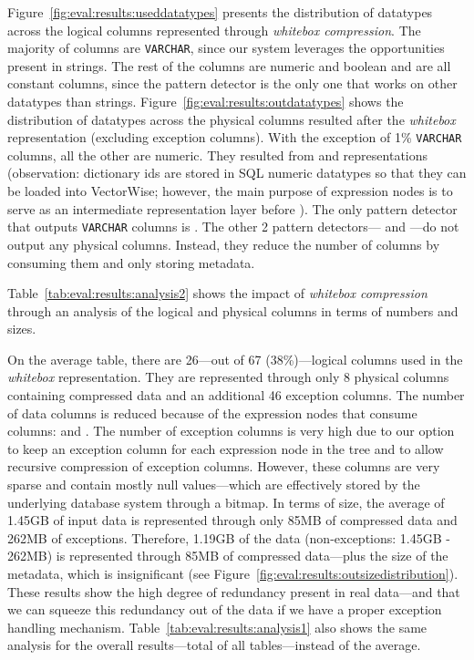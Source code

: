 Figure~\ref{fig:eval:results:useddatatypes} presents the distribution of datatypes across the logical columns represented through \textit{whitebox compression}. The majority of columns are \verb|VARCHAR|, since our system leverages the opportunities present in strings. The rest of the columns are numeric and boolean and are all constant columns, since the  pattern detector is the only one that works on other datatypes than strings. Figure~\ref{fig:eval:results:outdatatypes} shows the distribution of datatypes across the physical columns resulted after the \textit{whitebox} representation (excluding exception columns). With the exception of 1\% \verb|VARCHAR| columns, all the other are numeric. They resulted from  and  representations (observation: dictionary ids are stored in SQL numeric datatypes so that they can be loaded into VectorWise; however, the main purpose of  expression nodes is to serve as an intermediate representation layer before ). The only pattern detector that outputs \verb|VARCHAR| columns is . The other 2 pattern detectors--- and ---do not output any physical columns. Instead, they reduce the number of columns by consuming them and only storing metadata.

Table~\ref{tab:eval:results:analysis2} shows the impact of \textit{whitebox compression} through an analysis of the logical and physical columns in terms of numbers and sizes. 



On the average table, there are 26---out of 67 (38\%)---logical columns used in the \textit{whitebox} representation. They are represented through only 8 physical columns containing compressed data and an additional 46 exception columns. The number of data columns is reduced because of the expression nodes that consume columns:  and . The number of exception columns is very high due to our option to keep an exception column for each expression node in the tree and to allow recursive compression of exception columns. However, these columns are very sparse and contain mostly null values---which are effectively stored by the underlying database system through a bitmap. In terms of size, the average of 1.45GB of input data is represented through only 85MB of compressed data and 262MB of exceptions. Therefore, 1.19GB of the data (non-exceptions: 1.45GB - 262MB) is represented through 85MB of compressed data---plus the size of the metadata, which is insignificant (see Figure~\ref{fig:eval:results:outsizedistribution}). These results show the high degree of redundancy present in real data---and that we can squeeze this redundancy out of the data if we have a proper exception handling mechanism.
Table~\ref{tab:eval:results:analysis1} also shows the same analysis for the overall results---total of all tables---instead of the average.

